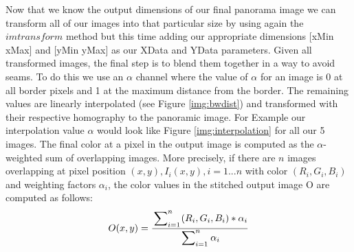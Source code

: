 \documentclass[subfigure,epsfig,fleqn,float,numbers=noenddot]{scrartcl}
\begin{document}
Now that we know the output dimensions of our final panorama image we can transform all of our images into that particular size by using again the $imtransform$ method but this time adding our appropriate dimensions [xMin xMax] and [yMin yMax] as our XData and YData parameters. Given all transformed images, the final step is to blend them together in a way to avoid seams. To do this we use an $\alpha$ channel where the value of $\alpha$ for an image is 0 at all border pixels and 1 at the maximum distance from the border. The remaining values are linearly interpolated (see Figure \ref{img:bwdist}) and transformed with their respective homography to the panoramic image. For Example our interpolation value $\alpha$ would look like Figure \ref{img:interpolation} for all our 5 images. The final color at a pixel in the output image is computed as the $\alpha$-weighted sum of overlapping images. More precisely, if there are $n$ images overlapping at pixel position $(x,y), I_i(x,y), i = 1...n$ with color $(R_i,G_i,B_i)$ and weighting factors $\alpha_i$, the color values in the stitched output image O are computed as follows:
\begin{equation*}
	O(x,y) = \frac{\sideset{}{_{i=1}^n}\sum_{} (R_i,G_i,B_i) * \alpha_i} {\sideset{}{_{i=1}^n}\sum_{} \alpha_i}
\end{equation*}
\end{document}
